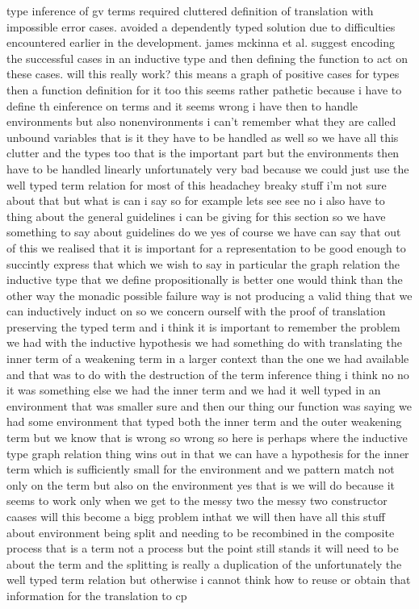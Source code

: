 type inference of gv terms required cluttered definition of translation with
impossible error cases. avoided a dependently typed solution due to
difficulties encountered earlier in the development. james mckinna et
al. suggest encoding the successful cases in an inductive type and then
defining the function to act on these cases. will this really work? this means
a graph of positive cases for types then a function definition for it too this
seems rather pathetic because i have to define th einference on terms and it
seems wrong i have then to handle environments but also nonenvironments i
can't remember what they are called unbound variables that is it they have to
be handled as well so we have all this clutter and the types too that is the
important part but the environments then have to be handled linearly
unfortunately very bad because we could just use the well typed term relation
for most of this headachey breaky stuff i'm not sure about that but what is
can i say so for example lets see see no i also have to thing about the
general guidelines i can be giving for this section so we have something to
say about guidelines do we yes of course we have can say that out of this we
realised that it is important for a representation to be good enough to
succintly express that which we wish to say in particular the graph relation
the inductive type that we define propositionally is better one would think
than the other way the monadic possible failure way is not producing a valid
thing that we can inductively induct on so we concern ourself with the proof
of translation preserving the typed term and i think it is important to
remember the problem we had with the inductive hypothesis we had something do
with translating the inner term of a weakening term in a larger context than
the one we had available and that was to do with the destruction of the term
inference thing i think no no it was something else we had the inner term and
we had it well typed in an environment that was smaller sure and then our
thing our function was saying we had some environment that typed both the
inner term and the outer weakening term but we know that is wrong so wrong so
here is perhaps where the inductive type graph relation thing wins out in that
we can have a hypothesis for the inner term which is sufficiently small for
the environment and we pattern match not only on the term but also on the
environment yes that is we will do because it seems to work only when we get
to the messy two the messy two constructor caases will this become a bigg
problem inthat we will then have all this stuff about environment being split
and needing to be recombined in the composite process that is a term not a
process but the point still stands it will need to be about the term and the
splitting is really a duplication of the unfortunately the well typed term
relation but otherwise i cannot think how to reuse or obtain that information
for the translation to cp

